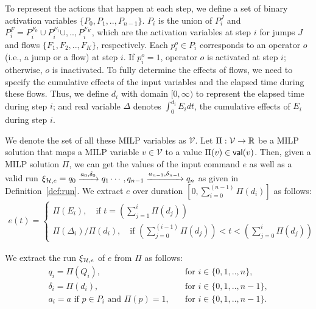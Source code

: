 \documentclass[sigconf]{acmart}
\begin{document}
To represent the actions that happen at each step, we define a set of binary activation variables $\{P_0, P_1,..,P_{n-1}\}$. $P_i$ is the union of $P^J_i$ and $P^F_i = P^{F_0}_i \cup P^{F_1}_i \cup,..,P^{F_K}_i$, which are the activation variables at step $i$ for jumps $J$ and flows $\{F_1, F_2,..,F_K\}$, respectively. Each $p_i^o \in P_i$ corresponds to an operator $o$ (i.e., a jump or a flow) at step $i$. If $p_i^o = 1$, operator $o$ is activated at step $i$; otherwise, $o$ is inactivated.  To fully determine the effects of flows, we need to specify the cumulative effects of the input variables and the elapsed time during these flows. Thus, we define $d_i$ with domain $[0,\infty)$ to represent the elapsed time during step $i$; and real variable $\Delta$ denotes $\int_{0}^{d_i} E_i dt$, the cumulative effects of $E_i$ during step $i$.

We denote the set of all these MILP variables as $\mathcal{V}$. Let $\Pi: \mathcal{V} \rightarrow \mathbb{R}$ be a MILP solution that maps a MILP variable $v \in \mathcal{V}$ to a value $\Pi(v) \in {\mathsf{val}}(v)$. Then, given a MILP solution $\Pi$, we can get the values of the input command $e$ as well as a valid run $\xi_{\mathcal{H},e} = q_0 \xrightarrow{a_0, \delta_0} q_1 \cdots,q_{n-1} \xrightarrow{a_{n-1}, \delta_{n-1}} q_n$ as given in Definition~\ref{def:run}. 
We extract $e$ over duration $[0, \sum_{i=0}^{(n-1)} \Pi(d_i)]$ as follows:
\begin{equation}\label{eq:extract_e}
    \begin{aligned}
    e(t)=
    \left\{
    \begin{array}{l}
    
    \Pi(E_i), \quad \text{if } t =  (\sum_{j=1}^i \Pi(d_j)) \\
    
    \Pi(\Delta_i)/\Pi(d_i), \quad \text{if } (\sum_{j=0}^{(i-1)} \Pi(d_j)) < t < (\sum_{j=0}^{i} \Pi(d_j))
    
    \end{array}
    \right.
    \end{aligned}
\end{equation}

We extract the run $\xi_{\mathcal{H},e}$ of $e$ from $\Pi$ as follows:
\begin{equation}\label{eq:extract_run}
    \begin{aligned}
    q_i = \Pi(Q_i), & \quad \text{for } i \in \{0,1,..,n\}, \\
    \delta_i = \Pi(d_i),& \quad \text{for } i \in \{0,1,..,n-1\}, \\
    a_i = a \text{ if } p \in P_i \text{ and } \Pi(p) = 1, & \quad \text{for } i \in \{0,1,..,n-1\}.
    \end{aligned}
\end{equation}
\end{document}
